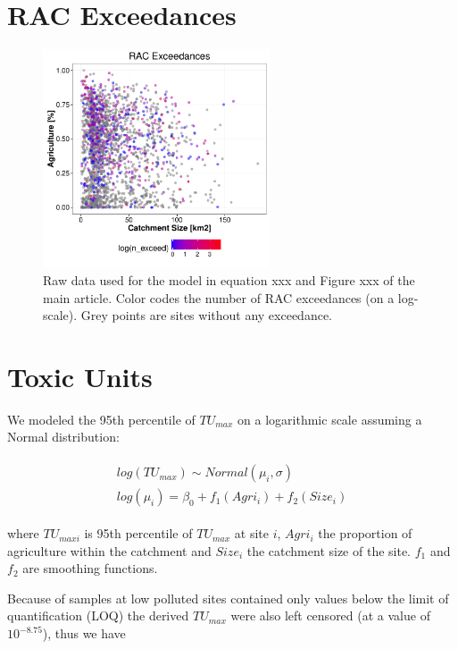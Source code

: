 \documentclass[pdftex,a4paper]{scrreprt}
\begin{document}
\section{RAC Exceedances}
\begin{figure}[h]
	\centering
	\includegraphics[width = 0.6\textwidth]{ezgagrirac}
	\caption{Raw data used for the model in equation xxx and Figure xxx of the main article. Color codes the number of RAC exceedances (on a log-scale). Grey points are sites without any exceedance.}
	\label{fig:ezgagrirac}
\end{figure}


\pagebreak
\section{Toxic Units}

We modeled the 95th percentile of $TU_{max}$ on a logarithmic scale assuming a Normal distribution:

\begin{align}
\begin{split}
  log(TU_{max}) \sim Normal(\mu_i, \sigma) \\
  log(\mu_i)= \beta_0 + f_1(Agri_i) + f_2(Size_i)
\end{split}
\end{align}

where $TU_{max i}$ is 95th percentile of $TU_{max}$ at site $i$, $Agri_i$ the proportion of agriculture within the catchment and $Size_i$ the catchment size of the site.  
$f_1$ and $f_2$ are smoothing functions.

Because of samples at low polluted sites contained only values below the limit of quantification (LOQ) the derived $TU_{max}$ were also left censored (at a value of $10^{-8.75}$), thus we have
\end{document}

